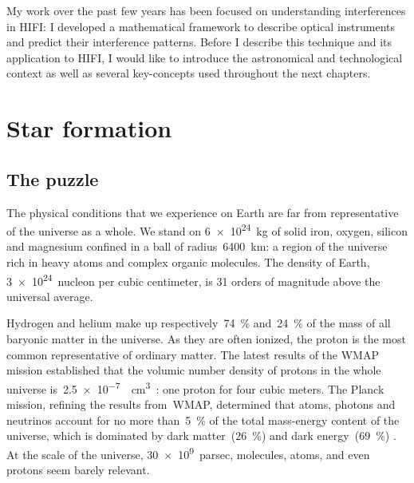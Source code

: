 My work over the past few years has been focused on understanding interferences in HIFI:
I developed a mathematical framework to describe optical instruments and predict their interference patterns.
Before I describe this technique and its application to HIFI,
I would like to introduce the astronomical and technological context as well as several key-concepts used throughout the next chapters.



\section{Star formation}

\subsection{The puzzle}

The physical conditions that we experience on Earth are far from representative of the universe as a whole.
We stand on \SI{6e24}{\kilo\gram} of solid iron, oxygen, silicon and magnesium confined in a ball of radius~\SI{6400}{\km}:
a region of the universe rich in heavy atoms and complex organic molecules.
The density of Earth, \SI{3e24}{nucleon} per cubic centimeter, is 31 orders of magnitude above the universal average.

Hydrogen and helium make up respectively~\SI{74}{\percent} and~\SI{24}{\percent} of the mass of all baryonic matter in the universe.
As they are often ionized, the proton is the most common representative of ordinary matter.
The latest results of the WMAP mission established that the volumic number density of protons in the whole universe is~\SI{2.5e-7}{\per\centi\meter\cubed}~\autocite{bennett2013nine}: one proton for four cubic meters.
The Planck mission, refining the results from~WMAP, determined that atoms, photons and neutrinos account for no more than~\SI{5}{\percent} of the total mass-energy content of the universe, which is dominated by dark matter~(\SI{26}{\percent}) and dark energy~(\SI{69}{\percent}) \autocite{ade2014planck}.
At the scale of the universe, \SI{30e9}{parsec}, molecules, atoms, and even protons seem barely relevant.

